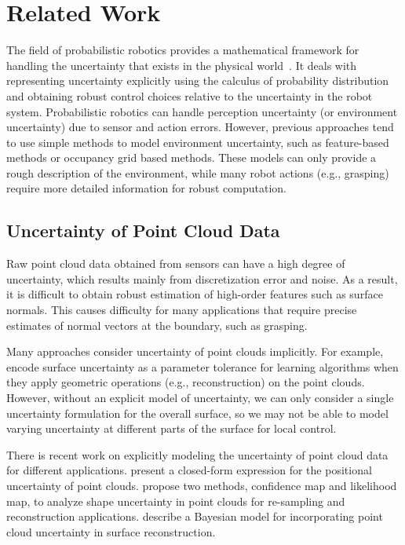 \section{Related Work}
\label{sec:7:related}
The field of probabilistic robotics provides a mathematical framework for handling the uncertainty that exists
in the physical world~\cite{PR:2005}.  It deals with representing uncertainty explicitly using the calculus of probability distribution
and obtaining robust control choices relative to the uncertainty in the robot system. Probabilistic robotics can handle perception uncertainty (or environment uncertainty) due to sensor and action errors. However, previous approaches tend to use simple methods to model environment uncertainty, such as feature-based methods or occupancy grid based methods. These models can only provide a rough description of the environment, while many robot actions (e.g., grasping) require more detailed information for robust computation.

\subsection{Uncertainty of Point Cloud Data}
\label{sec:7:related:data}
Raw point cloud data obtained from sensors can have a high degree of uncertainty, which results mainly from
discretization error and noise. As a result, it is difficult to obtain robust estimation of high-order features such as surface normals. This causes difficulty for many applications that require precise estimates of normal vectors at the boundary, such as grasping.

Many approaches consider uncertainty of point clouds implicitly. For example, \cite{Steinke:2005,Bernhard:2005nips} encode surface uncertainty as a parameter tolerance for learning algorithms when they apply geometric operations (e.g., reconstruction) on the point clouds. However, without an explicit model of uncertainty, we can only consider a single uncertainty formulation for the overall surface, so we may not be able to model varying uncertainty at different parts of the surface for local control.

There is recent work on explicitly modeling the uncertainty of point cloud data for different applications. \cite{Bae:2009} present a closed-form expression for the positional uncertainty of point clouds. \cite{Pauly:2004} propose two methods, confidence map and likelihood map, to analyze shape uncertainty in
point clouds for re-sampling and reconstruction applications. \cite{Jenke:2006} describe a Bayesian model for incorporating point cloud uncertainty
in surface reconstruction.

